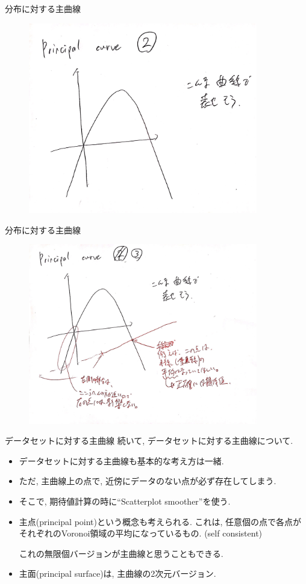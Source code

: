 \documentclass[dvipdfmx,8pt]{beamer}
\begin{document}
  \begin{frame}{分布に対する主曲線}
    \begin{figure}[htb]
      \centering
      \includegraphics[width=10cm,clip]{images/principal-curve-distribution-2.jpg}
    \end{figure}
  \end{frame}
  \begin{frame}{分布に対する主曲線}
    \begin{figure}[htb]
      \centering
      \includegraphics[width=10cm,clip]{images/principal-curve-distribution-3.jpg}
    \end{figure}
  \end{frame}
  \begin{frame}{データセットに対する主曲線}
    続いて, データセットに対する主曲線について.
    \begin{itemize}
      \item データセットに対する主曲線も基本的な考え方は一緒.
      \item ただ, 主曲線上の点で, 近傍にデータのない点が必ず存在してしまう.
      \item そこで, 期待値計算の時に``Scatterplot smoother''を使う.
      \item 主点(principal point)という概念も考えられる.
      これは, 任意個の点で各点がそれぞれのVoronoi領域の平均になっているもの.
      (self consistent)

      これの無限個バージョンが主曲線と思うこともできる.

      \item 主面(principal surface)は, 主曲線の2次元バージョン.
    \end{itemize}
  \end{frame}
\end{document}
